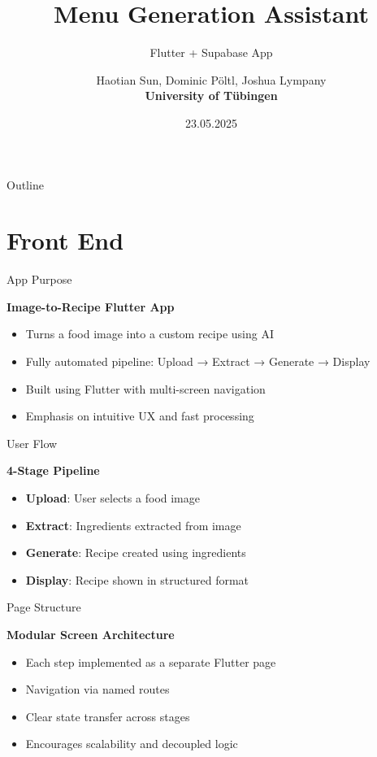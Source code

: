 \documentclass{beamer}
\title{Menu Generation Assistant}
\subtitle{Flutter + Supabase App}
\author{Haotian Sun, Dominic Pöltl, Joshua Lympany \\ \textbf{University of Tübingen}}
\date{23.05.2025}
\institute{Department of Marketing}
\begin{document}
\begin{frame}
    \titlepage
\end{frame}

\begin{frame}{Outline}
    \tableofcontents
\end{frame}

\section{Front End}

\begin{frame}{App Purpose}
    \begin{block}{\textbf{Image-to-Recipe Flutter App}}
        \begin{itemize}
            \item Turns a food image into a custom recipe using AI
            \item Fully automated pipeline: Upload → Extract → Generate → Display
            \item Built using Flutter with multi-screen navigation
            \item Emphasis on intuitive UX and fast processing
        \end{itemize}
    \end{block}
\end{frame}

\begin{frame}{User Flow}
    \begin{block}{\textbf{4-Stage Pipeline}}
        \begin{itemize}
            \item \textbf{Upload}: User selects a food image
            \item \textbf{Extract}: Ingredients extracted from image
            \item \textbf{Generate}: Recipe created using ingredients
            \item \textbf{Display}: Recipe shown in structured format
        \end{itemize}
    \end{block}
\end{frame}

\begin{frame}{Page Structure}
    \begin{block}{\textbf{Modular Screen Architecture}}
        \begin{itemize}
            \item Each step implemented as a separate Flutter page
            \item Navigation via named routes
            \item Clear state transfer across stages
            \item Encourages scalability and decoupled logic
        \end{itemize}
    \end{block}
\end{frame}
\end{document}
